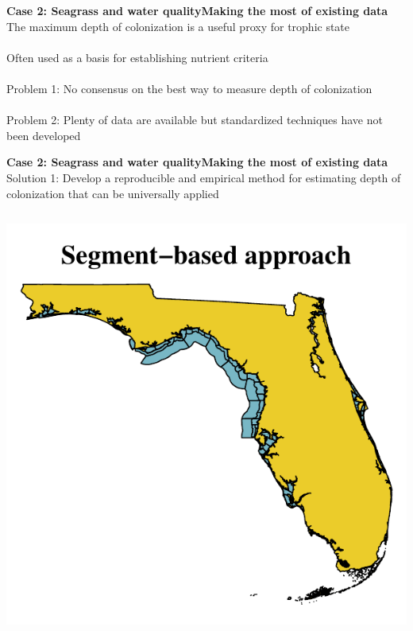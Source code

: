 \documentclass[serif]{beamer}\usepackage[]{graphicx}\usepackage[]{color}
\makeatletter
\def\maxwidth{ %
  \ifdim\Gin@nat@width>\linewidth
    \linewidth
  \else
    \Gin@nat@width
  \fi
}
\newenvironment{knitrout}{}{} %
\makeatother
\begin{document}
\begin{frame}{\textbf{Case 2: Seagrass and water quality}}{\textbf{Making the most of existing data}}
\onslide<+->
The maximum depth of colonization is a useful proxy for trophic state \\~\\
Often used as a basis for establishing nutrient criteria \\~\\
\onslide<+->
\alert{Problem 1:} No consensus on the best way to measure depth of colonization\\~\\
\alert{Problem 2:} Plenty of data are available but standardized techniques have not been developed
\end{frame}

\begin{frame}{\textbf{Case 2: Seagrass and water quality}}{\textbf{Making the most of existing data}}
\onslide<+->
\alert{Solution 1:} Develop a reproducible and empirical method for estimating depth of colonization that can be universally applied
\begin{columns}[T]
\begin{column}{0.5\textwidth}
\begin{knitrout}
\color{fgcolor}

{\centering \includegraphics[width=\maxwidth]{fig//segmap} 

}
\end{knitrout}
\end{column}
\end{columns}
\end{frame}
\end{document}
